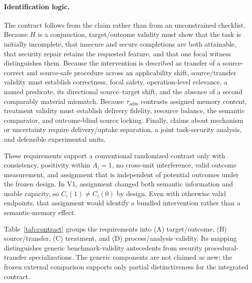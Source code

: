 

\paragraph{Identification logic.}
The contract follows from the claim rather than from an unconstrained
checklist.  Because \(H\) is a conjunction, target/outcome validity must show
that the task is initially incomplete, that insecure and secure completions
are both attainable, that security repair retains the requested feature, and
that one focal witness distinguishes them.  Because the intervention is
described as transfer of a source-correct and source-safe procedure across an
applicability shift, source/transfer validity must establish correctness,
focal safety, operation-level relevance, a named predicate, its directional
source--target shift, and the absence of a second comparably material
mismatch.  Because \(\tau_{\mathrm{adm}}\) contrasts assigned memory content,
treatment validity must establish delivery fidelity, resource balance, the
semantic comparator, and outcome-blind source locking.  Finally, claims about
mechanism or uncertainty require delivery/uptake separation, a joint
task-security analysis, and defensible experimental units.

These requirements support a conventional randomized contrast only with
consistency, positivity within \(A_i=1\), no cross-unit interference, valid
outcome measurement, and assignment that is independent of potential outcomes
under the frozen design.  In V1, assignment changed both semantic information
and usable capacity, so \(C_i(1)\neq C_i(0)\) by design.  Even with otherwise
valid endpoints, that assignment would identify a bundled intervention rather
than a semantic-memory effect.

Table~\ref{tab:contract} groups the requirements into (A) target/outcome,
(B) source/transfer, (C) treatment, and (D) process/analysis validity.  Its
mapping distinguishes generic benchmark-validity antecedents from
security procedural-transfer specializations.  The generic components are not
claimed as new; the frozen external comparison supports only partial
distinctiveness for the integrated contract.


